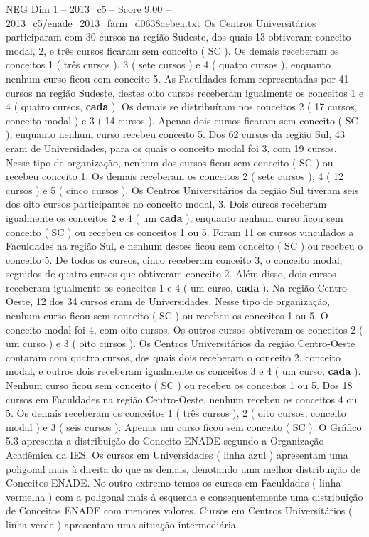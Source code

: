 \begin{textsample}{NEG Dim 1 – 2013\_c5 – Score 9.00 – 2013\_c5/enade\_2013\_farm\_d0638aebea.txt}
Os Centros Universitários participaram com 30 cursos na região Sudeste, dos quais 13 obtiveram conceito modal, 2, e três cursos ficaram sem conceito ( SC ).
Os demais receberam os conceitos 1 ( três cursos ), 3 ( sete cursos ) e 4 ( quatro cursos ), enquanto nenhum curso ficou com conceito 5.
As Faculdades foram representadas por 41 cursos na região Sudeste, destes oito cursos receberam igualmente os conceitos 1 e 4 ( quatro cursos, \textbf{cada} ).
Os demais se distribuíram nos conceitos 2 ( 17 cursos, conceito modal ) e 3 ( 14 cursos ).
Apenas dois cursos ficaram sem conceito ( SC ), enquanto nenhum curso recebeu conceito 5.
Dos 62 cursos da região Sul, 43 eram de Universidades, para os quais o conceito modal foi 3, com 19 cursos.
Nesse tipo de organização, nenhum dos cursos ficou sem conceito ( SC ) ou recebeu conceito 1.
Os demais receberam os conceitos 2 ( sete cursos ), 4 ( 12 cursos ) e 5 ( cinco cursos ).
Os Centros Universitários da região Sul tiveram seis dos oito cursos participantes no conceito modal, 3.
Dois cursos receberam igualmente os conceitos 2 e 4 ( um \textbf{cada} ), enquanto nenhum curso ficou sem conceito ( SC ) ou recebeu os conceitos 1 ou 5.
Foram 11 os cursos vinculados a Faculdades na região Sul, e nenhum destes ficou sem conceito ( SC ) ou recebeu o conceito 5.
De todos os cursos, cinco receberam conceito 3, o conceito modal, seguidos de quatro cursos que obtiveram conceito 2.
Além disso, dois cursos receberam igualmente os conceitos 1 e 4 ( um curso, \textbf{cada} ).
Na região Centro-Oeste, 12 dos 34 cursos eram de Universidades.
Nesse tipo de organização, nenhum curso ficou sem conceito ( SC ) ou recebeu os conceitos 1 ou 5.
O conceito modal foi 4, com oito cursos.
Os outros cursos obtiveram os conceitos 2 ( um curso ) e 3 ( oito cursos ).
Os Centros Universitários da região Centro-Oeste contaram com quatro cursos, dos quais dois receberam o conceito 2, conceito modal, e outros dois receberam igualmente os conceitos 3 e 4 ( um curso, \textbf{cada} ).
Nenhum curso ficou sem conceito ( SC ) ou recebeu os conceitos 1 ou 5.
Dos 18 cursos em Faculdades na região Centro-Oeste, nenhum recebeu os conceitos 4 ou 5.
Os demais receberam os conceitos 1 ( três cursos ), 2 ( oito cursos, conceito modal ) e 3 ( seis cursos ).
Apenas um curso ficou sem conceito ( SC ).
O Gráfico 5.3 apresenta a distribuição do Conceito ENADE segundo a Organização Acadêmica da IES.
Os cursos em Universidades ( linha azul ) apresentam uma poligonal mais à direita do que as demais, denotando uma melhor distribuição de Conceitos ENADE.
No outro extremo temos os cursos em Faculdades ( linha vermelha ) com a poligonal mais à esquerda e consequentemente uma distribuição de Conceitos ENADE com menores valores.
Cursos em Centros Universitários ( linha verde ) apresentam uma situação intermediária.

\end{textsample}
